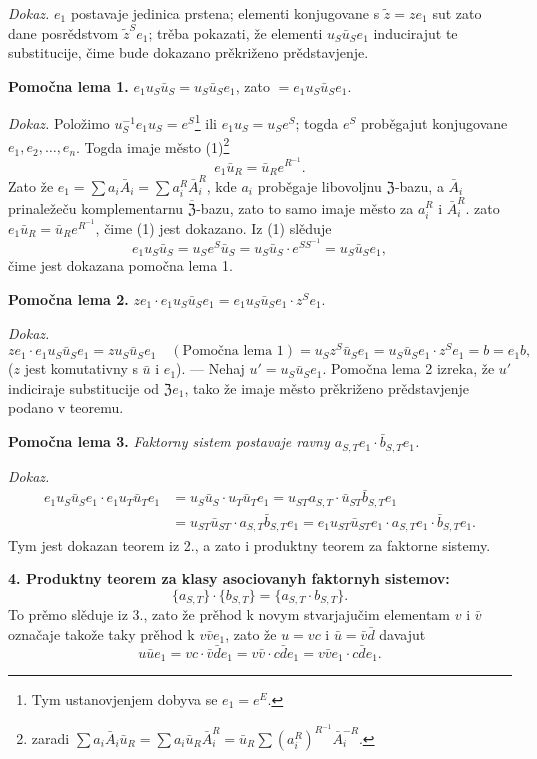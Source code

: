 \documentclass[11pt]{article}
\newcommand{\srcfn}[2]{\footnote{#2}}
\begin{document}
\noindent\emph{Dokaz.} \(e_1\) postavaje jedinica prstena; elementi konjugovane s \(\tilde z=ze_1\) sut zato dane posrědstvom \(\tilde z^Se_1\); trěba pokazati, že elementi \(u_S\bar u_Se_1\) inducirajut te substitucije, čime bude dokazano prěkriženo prědstavjenje.

\noindent\textbf{Pomočna lema 1.} \(e_1u_S\bar u_S=u_S\bar u_Se_1\), zato \(=e_1u_S\bar u_Se_1\).

\noindent\emph{Dokaz.} Položimo \(u_S^{-1}e_1u_S=e^S\)\srcfn{1}{Tym ustanovjenjem dobyva se \(e_1=e^E\).} ili \(e_1u_S=u_Se^S\); togda \(e^S\) proběgajut konjugovane \(e_1,e_2,\ldots,e_n\). Togda imaje město (1)\srcfn{2}{zaradi \(\sum a_i\bar A_i\bar u_R=\sum a_i\bar u_R\bar A_i^R=\bar u_R\sum(a_i^R)^{R^{-1}}\bar A_i^{-R}\).}
\[
e_1\bar u_R=\bar u_Re^{R^{-1}}.
\]
Zato že \(e_1=\sum a_i\bar A_i=\sum a_i^R\bar A_i^R\), kde \(a_i\) proběgaje libovoljnu \(\mathfrak Z\)-bazu, a \(\bar A_i\) prinaležeču komplementarnu \(\overline{\mathfrak Z}\)-bazu, zato to samo imaje město za \(a_i^R\) i \(\bar A_i^R\). zato \(e_1\bar u_R=\bar u_Re^{R^{-1}}\), čime (1) jest dokazano. Iz (1) slěduje
\[
e_1u_S\bar u_S=u_Se^S\bar u_S=u_S\bar u_S\cdot e^{SS^{-1}}=u_S\bar u_Se_1,
\]
čime jest dokazana pomočna lema 1.

\noindent\textbf{Pomočna lema 2.} \(ze_1\cdot e_1u_S\bar u_Se_1=e_1u_S\bar u_Se_1\cdot z^Se_1\).

\noindent\emph{Dokaz.} 
\[
ze_1\cdot e_1u_S\bar u_Se_1
=zu_S\bar u_Se_1\quad(\text{Pomočna lema 1})
=u_Sz^S\bar u_Se_1
=u_S\bar u_Se_1\cdot z^Se_1
=b=e_1b,
\]
(\(z\) jest komutativny s \(\bar u\) i \(e_1\)). --- Nehaj \(u'=u_S\bar u_Se_1\). Pomočna lema 2 izreka, že \(u'\) indiciraje substitucije od \(\mathfrak Ze_1\), tako že imaje město prěkriženo prědstavjenje podano v teoremu.

\noindent\textbf{Pomočna lema 3.} \emph{Faktorny sistem postavaje ravny \(a_{S,T}e_1\cdot\bar b_{S,T}e_1\).}

\noindent\emph{Dokaz.}
\[
\begin{aligned}
e_1u_S\bar u_Se_1\cdot e_1u_T\bar u_Te_1
&=u_S\bar u_S\cdot u_T\bar u_Te_1
 =u_{ST}a_{S,T}\cdot\bar u_{ST}\bar b_{S,T}e_1\\
&=u_{ST}\bar u_{ST}\cdot a_{S,T}\bar b_{S,T}e_1
 =e_1u_{ST}\bar u_{ST}e_1\cdot a_{S,T}e_1\cdot\bar b_{S,T}e_1.
\end{aligned}
\]
Tym jest dokazan teorem iz 2., a zato i produktny teorem za faktorne sistemy.

\noindent\textbf{4. Produktny teorem za klasy asociovanyh faktornyh sistemov:}
\[
\{a_{S,T}\}\cdot\{b_{S,T}\}=\{a_{S,T}\cdot b_{S,T}\}.
\]
To prěmo slěduje iz 3., zato že prěhod k novym stvarjajučim elementam \(v\) i \(\bar v\) označaje takože taky prěhod k \(v\bar ve_1\), zato že \(u=vc\) i \(\bar u=\bar v\bar d\) davajut
\[
u\bar ue_1=vc\cdot\bar v\bar de_1=v\bar v\cdot c\bar de_1=v\bar ve_1\cdot c\bar de_1.
\]
\end{document}
